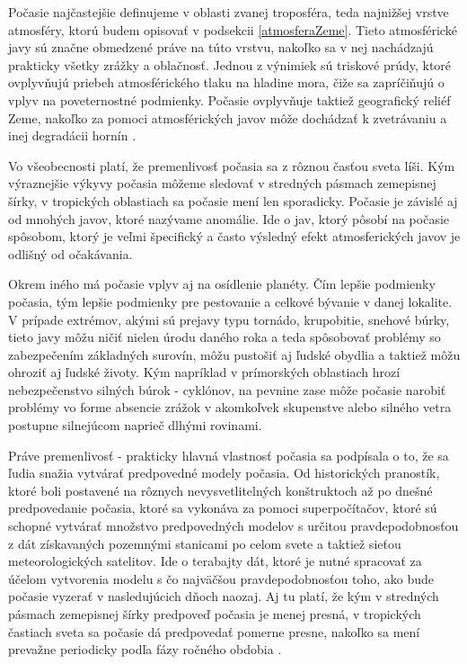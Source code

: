 Počasie najčastejšie definujeme v oblasti zvanej troposféra, teda najnižšej vrstve atmosféry, ktorú budem opisovať v podsekcii \ref{atmosferaZeme}. Tieto atmosférické javy sú značne obmedzené práve na túto vrstvu, nakoľko sa v nej nachádzajú prakticky všetky zrážky a oblačnosť. Jednou z výnimiek sú triskové prúdy, ktoré ovplyvňujú priebeh atmosférického tlaku na hladine mora, čiže sa zapríčiňujú o vplyv na poveternostné podmienky. Počasie ovplyvňuje taktiež geografický reliéf Zeme, nakoľko za pomoci atmosférických javov môže dochádzať k zvetrávaniu a inej degradácii hornín \cite{meteo}. 

Vo všeobecnosti platí, že premenlivosť počasia sa z rôznou časťou sveta líši. Kým výraznejšie výkyvy počasia môžeme sledovať v stredných pásmach zemepisnej šírky, v tropických oblastiach sa počasie mení len sporadicky. Počasie je závislé aj od mnohých javov, ktoré nazývame anomálie. Ide o jav, ktorý pôsobí na počasie spôsobom, ktorý je veľmi špecifický a často výsledný efekt atmosferických javov je odlišný od očakávania. 

Okrem iného má počasie vplyv aj na osídlenie planéty. Čím lepšie podmienky počasia, tým lepšie podmienky pre pestovanie a celkové bývanie v danej lokalite. V prípade extrémov, akými sú prejavy typu tornádo, krupobitie, snehové búrky, tieto javy môžu ničiť nielen úrodu daného roka a teda spôsobovať problémy so zabezpečením základných surovín, môžu pustošiť aj ľudské obydlia a taktiež môžu ohroziť aj ľudské životy. Kým napríklad v prímorských oblastiach hrozí nebezpečenstvo silných búrok - cyklónov, na pevnine zase môže počasie narobiť problémy vo forme absencie zrážok v akomkoľvek skupenstve alebo silného vetra postupne silnejúcom naprieč dlhými rovinami.

Práve premenlivosť - prakticky hlavná vlastnosť počasia sa podpísala o to, že sa ľudia snažia vytvárať predpovedné modely počasia. Od historických pranostík, ktoré boli postavené na rôznych nevysvetlitelných konštruktoch až po dnešné predpovedanie počasia, ktoré sa vykonáva za pomoci superpočítačov, ktoré sú schopné vytvárať množstvo predpovedných modelov s určitou pravdepodobnosťou z dát získavaných pozemnými stanicami po celom svete a taktiež sieťou meteorologických satelitov. Ide o terabajty dát, ktoré je nutné spracovať za účelom vytvorenia modelu s čo najväčšou pravdepodobnosťou toho, ako bude počasie vyzerať v nasledujúcich dňoch naozaj. Aj tu platí, že kým v stredných pásmach zemepisnej šírky predpoveď počasia je menej presná, v tropických častiach sveta sa počasie dá predpovedať pomerne presne, nakoľko sa mení prevažne periodicky podľa fázy ročného obdobia \cite{meteo}.

